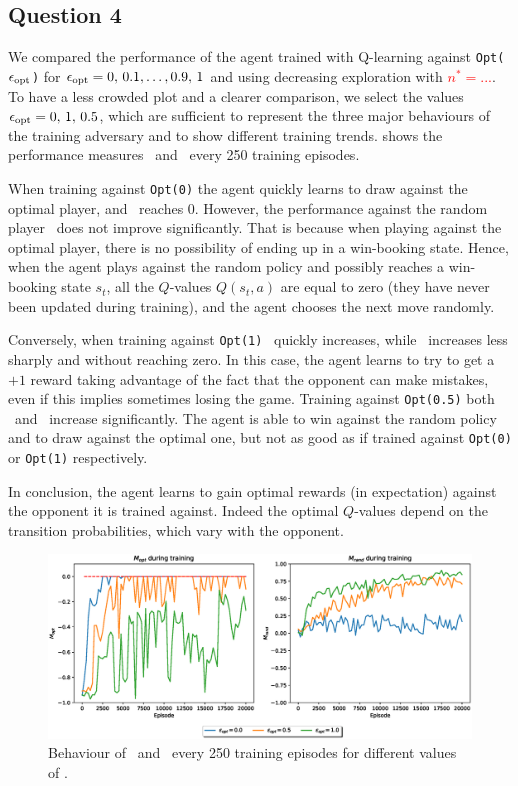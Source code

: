 \documentclass[10pt]{IEEEtran}
\begin{document}
\subsection*{Question 4}
We compared the performance of the agent trained with Q-learning against \texttt{Opt($\epsilon_{\text{opt}}$)} for $\epsilon_{\text{opt}} = 0, \, 0.1, \dots, 0.9, \, 1$ and using decreasing exploration with \textcolor{red}{$n^{*} = ...$}. To have a less crowded plot and a clearer comparison, we select the values $\epsilon_{\text{opt}} = 0, \, 1, \, 0.5$, which are sufficient to represent the three major behaviours of the training adversary and to show different training trends.  shows the performance measures \mopt\  and \mrand\  every 250 training episodes.

When training against \texttt{Opt(0)} the agent quickly learns to draw against the optimal player, and \mopt\  reaches 0. However, the performance against the random player \mrand\  does not improve significantly. That is because when playing against the optimal player, there is no possibility of ending up in a win-booking state. Hence, when the agent plays against the random policy and possibly reaches a win-booking state $s_t$, all the $Q$-values $Q(s_t, a)$ are equal to zero (they have never been updated during training), and the agent chooses the next move randomly. 

Conversely, when training against \texttt{Opt(1)} \mrand\  quickly increases, while \mopt\  increases less sharply and without reaching zero. In this case, the agent learns to try to get a $+1$ reward taking advantage of the fact that the opponent can make mistakes, even if this implies sometimes losing the game. Training against \texttt{Opt(0.5)} both \mopt\  and \mrand\  increase significantly. The agent is able to win against the random policy and to draw against the optimal one, but not as good as if trained against \texttt{Opt(0)} or \texttt{Opt(1)} respectively.

In conclusion, the agent learns to gain optimal rewards (in expectation) against the opponent it is trained against. Indeed the optimal $Q$-values depend on the transition probabilities, which vary with the opponent.

\begin{figure}[H]
    \centering
    \includegraphics[width=\linewidth]{code/figures/performance_epsilon_opt.eps}
    \caption{Behaviour of \mopt\  and \mrand\  every 250 training episodes for different values of \eopt.}
    \label{plot_question4}
\end{figure}
\end{document}
